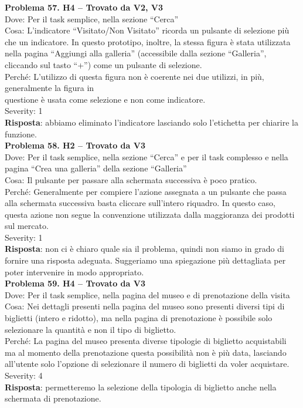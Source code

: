 \documentclass{article}
\begin{document}
\noindent \textbf{Problema 57. H4 – Trovato da V2, V3} \\
Dove: Per il task semplice, nella sezione “Cerca” \\
Cosa: L’indicatore “Visitato/Non Visitato” ricorda un pulsante di selezione più che un indicatore. In questo prototipo, inoltre, la stessa figura è stata utilizzata nella pagina “Aggiungi alla galleria” (accessibile dalla sezione “Galleria”, cliccando sul tasto “+”) come un pulsante di selezione. \\
Perché: L’utilizzo di questa figura non è coerente nei due utilizzi, in più, generalmente la figura in \\ questione è usata come selezione e non come indicatore. \\
Severity: 1 \\
\textbf{Risposta}: abbiamo eliminato l’indicatore lasciando solo l’etichetta per chiarire la funzione.\\

\noindent \textbf{Problema 58. H2 – Trovato da V3} \\
Dove: Per il task semplice, nella sezione “Cerca” e per il task complesso e nella pagina “Crea una galleria” della sezione “Galleria” \\
Cosa: Il pulsante per passare alla schermata successiva è poco pratico. \\
Perché: Generalmente per compiere l’azione assegnata a un pulsante che passa alla schermata successiva basta cliccare sull’intero riquadro. In questo caso, questa azione non segue la convenzione utilizzata dalla maggioranza dei prodotti sul mercato. \\
Severity: 1 \\
\textbf{Risposta}: non ci è chiaro quale sia il problema, quindi non siamo in grado di fornire una risposta adeguata. Suggeriamo una spiegazione più dettagliata per poter intervenire in modo appropriato.\\

\noindent \textbf{Problema 59. H4 – Trovato da V3} \\
Dove: Per il task semplice, nella pagina del museo e di prenotazione della visita \\
Cosa: Nei dettagli presenti nella pagina del museo sono presenti diversi tipi di biglietti (intero e ridotto), ma nella pagina di prenotazione è possibile solo selezionare la quantità e non il tipo di biglietto. \\
Perché: La pagina del museo presenta diverse tipologie di biglietto acquistabili ma al momento della prenotazione questa possibilità non è più data, lasciando all’utente solo l’opzione di selezionare il numero di biglietti da voler acquistare. \\
Severity: 4 \\
\textbf{Risposta}: permetteremo la selezione della tipologia di biglietto anche nella schermata di prenotazione.\\
\end{document}
